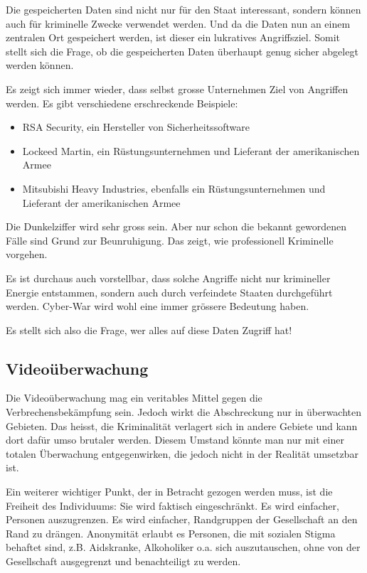 Die gespeicherten Daten sind nicht nur für den Staat interessant,
sondern können auch für kriminelle Zwecke verwendet werden.
Und da die Daten nun an einem zentralen Ort gespeichert werden, ist
dieser ein lukratives Angriffsziel.
Somit stellt sich die Frage, ob die gespeicherten Daten
überhaupt genug sicher abgelegt werden können.

Es zeigt sich immer wieder, dass selbst grosse Unternehmen Ziel von Angriffen
werden. Es gibt verschiedene erschreckende Beispiele:
\begin{itemize}
\item RSA Security, ein Hersteller von Sicherheitssoftware
\item Lockeed Martin, ein Rüstungsunternehmen und Lieferant der amerikanischen Armee
\item Mitsubishi Heavy Industries, ebenfalls ein Rüstungsunternehmen und
Lieferant der amerikanischen Armee
\end{itemize}

Die Dunkelziffer wird sehr gross sein. Aber nur schon die bekannt gewordenen
Fälle sind Grund zur Beunruhigung. Das zeigt, wie professionell
Kriminelle vorgehen.

Es ist durchaus auch vorstellbar, dass solche Angriffe nicht nur krimineller
Energie entstammen, sondern auch durch verfeindete Staaten durchgeführt werden.
Cyber-War wird wohl eine immer grössere Bedeutung haben.

Es stellt sich also die Frage, wer alles auf diese Daten Zugriff hat!
\subsection*{Videoüberwachung}
Die Videoüberwachung mag ein veritables Mittel gegen die Verbrechensbekämpfung sein.
Jedoch wirkt die Abschreckung nur in überwachten Gebieten.
Das heisst, die Kriminalität verlagert sich in andere Gebiete und
kann dort dafür umso brutaler werden.
Diesem Umstand könnte man nur mit einer totalen Überwachung entgegenwirken,
die jedoch nicht in der Realität umsetzbar ist.

Ein weiterer wichtiger Punkt, der in Betracht gezogen werden muss,
ist die Freiheit des Individuums: Sie wird faktisch eingeschränkt. 
Es wird einfacher, Personen auszugrenzen.
Es wird einfacher, Randgruppen der Gesellschaft an den Rand zu drängen.
Anonymität erlaubt es Personen, die mit sozialen Stigma behaftet sind,
z.B. Aidskranke, Alkoholiker o.a. sich auszutauschen, ohne von der
Gesellschaft ausgegrenzt und benachteiligt zu werden.

